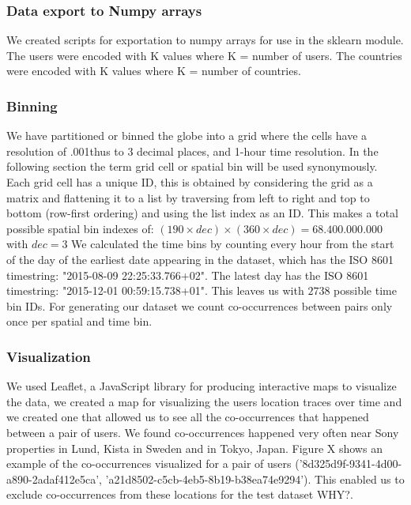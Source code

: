 \subsubsection{Data export to Numpy arrays}
We created scripts for exportation to numpy arrays for use in the sklearn module. The users were encoded with K values where K = number of users. The countries were encoded with K values where K = number of countries.
\subsubsection{Binning} \label{ssec:binning}
We have partitioned or binned the globe into a grid where the cells have a resolution of .001\degree thus to 3 decimal places, and 1-hour time resolution. In the following section the term grid cell or spatial bin will be used synonymously. Each grid cell has a unique ID, this is obtained by considering the grid as a matrix and flattening it to a list by traversing from left to right and top to bottom (row-first ordering) and using the list index as an ID. This makes a total possible spatial bin indexes of: $(190\times dec)\times(360\times dec)=68.400.000.000$ with $dec=3$ We calculated the time bins by counting every hour from the start of the day of the earliest date appearing in the dataset, which has the ISO 8601 timestring: "2015-08-09 22:25:33.766+02". The latest day has the ISO 8601 timestring: "2015-12-01 00:59:15.738+01". This leaves us with $2738$ possible time bin IDs. For generating our dataset we count co-occurrences between pairs only once per spatial and time bin.

\subsubsection{Visualization}
We used Leaflet\cite{leaflet}, a JavaScript library for producing interactive maps to visualize the data, we created a map for visualizing the users location traces over time and we created one that allowed us to see all the co-occurrences that happened between a pair of users. We found co-occurrences happened very often near Sony properties in Lund\cite{sony_headquarters_sweden_lund}, Kista\cite{sony_headquarters_sweden_kista} in Sweden and in Tokyo\cite{sony_headquarters_japan}, Japan. Figure X shows an example of the co-occurrences visualized for a pair of users ('8d325d9f-9341-4d00-a890-2adaf412e5ca', 'a21d8502-c5cb-4eb5-8b19-b38ea74e9294'). This enabled us to exclude co-occurrences from these locations for the test dataset {\color{red} WHY?}.

